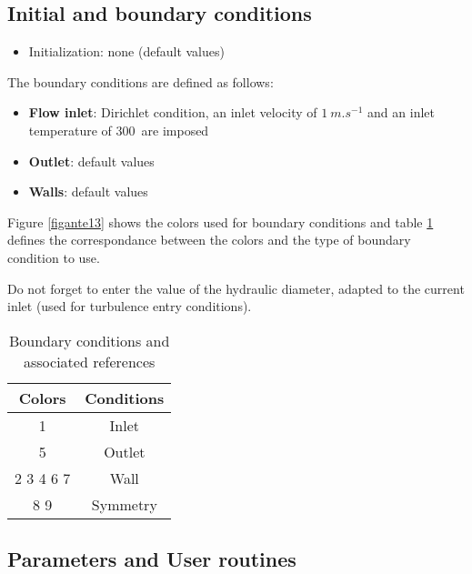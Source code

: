 	\subsection{Initial and boundary conditions}

\begin{itemize}
\renewcommand{\labelitemi}{$\rightarrow$}
	\item Initialization: none (default values)
\end{itemize}


The boundary conditions are defined as follows:
\begin{itemize}
	\item {\bfseries Flow inlet}: Dirichlet condition, an inlet velocity of
$1\ m.s^{-1}$ and an inlet temperature of 300\degresC\ are imposed
	\item {\bfseries Outlet}: default values
	\item {\bfseries Walls}: default values
\end{itemize}

Figure \ref{figante13} shows the colors used for boundary conditions and 
table \ref{tabante11} defines the correspondance between the colors and  
the type of boundary condition to use.

Do not forget to enter the value of the hydraulic diameter, adapted to the
current inlet (used for turbulence entry conditions).\\

\begin{table}[htp]
\begin{center}
\begin{tabular}{|c|c|}
\hline
Colors & Conditions \\
\hline
1 & Inlet \\
\hline
5 & Outlet \\
\hline
2 3 4 6 7 & Wall \\
\hline
8 9 & Symmetry\\
\hline
\end{tabular}
\caption{\label{tabante11}Boundary conditions and associated references}
\end{center}
\end{table}

	\subsection{Parameters and User routines}

